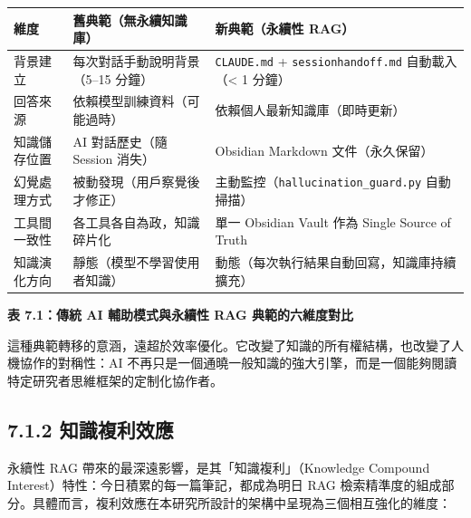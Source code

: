 {\def\LTcaptype{none} %
\begin{longtable}[]{@{}
  >{\raggedright\arraybackslash}p{}
  >{\raggedright\arraybackslash}p{}
  >{\raggedright\arraybackslash}p{}@{}}
\toprule\noalign{}
\begin{minipage}[b]{\linewidth}\raggedright
維度
\end{minipage} & \begin{minipage}[b]{\linewidth}\raggedright
舊典範（無永續知識庫）
\end{minipage} & \begin{minipage}[b]{\linewidth}\raggedright
新典範（永續性 RAG）
\end{minipage} \\
\midrule\noalign{}
\endhead
\bottomrule\noalign{}
\endlastfoot
背景建立 & 每次對話手動說明背景（5--15 分鐘） & \texttt{CLAUDE.md} +
\texttt{sessionhandoff.md} 自動載入（\textless{} 1 分鐘） \\
回答來源 & 依賴模型訓練資料（可能過時） &
依賴個人最新知識庫（即時更新） \\
知識儲存位置 & AI 對話歷史（隨 Session 消失） & Obsidian Markdown
文件（永久保留） \\
幻覺處理方式 & 被動發現（用戶察覺後才修正） &
主動監控（\texttt{hallucination\_guard.py} 自動掃描） \\
工具間一致性 & 各工具各自為政，知識碎片化 & 單一 Obsidian Vault 作為
Single Source of Truth \\
知識演化方向 & 靜態（模型不學習使用者知識） &
動態（每次執行結果自動回寫，知識庫持續擴充） \\
\end{longtable}
}

\textbf{表 7.1：傳統 AI 輔助模式與永續性 RAG 典範的六維度對比}

這種典範轉移的意涵，遠超於效率優化。它改變了知識的所有權結構，也改變了人機協作的對稱性：AI
不再只是一個通曉一般知識的強大引擎，而是一個能夠閱讀特定研究者思維框架的定制化協作者。

\subsection{7.1.2
知識複利效應}\label{ux77e5ux8b58ux8907ux5229ux6548ux61c9}

永續性 RAG 帶來的最深遠影響，是其「知識複利」（Knowledge Compound
Interest）特性：今日積累的每一篇筆記，都成為明日 RAG
檢索精準度的組成部分。具體而言，複利效應在本研究所設計的架構中呈現為三個相互強化的維度：


